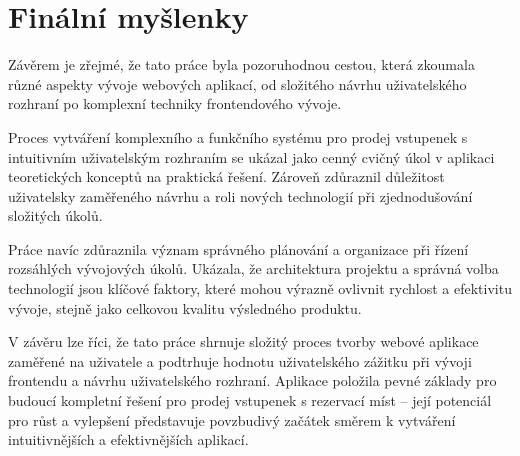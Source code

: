 \section*{Finální myšlenky}
\label{sec:zaver-myslenky}
Závěrem je zřejmé, že tato práce byla pozoruhodnou cestou, která zkoumala různé aspekty vývoje webových aplikací, od složitého návrhu uživatelského rozhraní po komplexní techniky frontendového vývoje.

Proces vytváření komplexního a funkčního systému pro prodej vstupenek s intuitivním uživatelským rozhraním se ukázal jako cenný cvičný úkol v aplikaci teoretických konceptů na praktická řešení.
Zároveň zdůraznil důležitost uživatelsky zaměřeného návrhu a roli nových technologií při zjednodušování složitých úkolů.

Práce navíc zdůraznila význam správného plánování a organizace při řízení rozsáhlých vývojových úkolů.
Ukázala, že architektura projektu a správná volba technologií jsou klíčové faktory, které mohou výrazně ovlivnit rychlost a efektivitu vývoje, stejně jako celkovou kvalitu výsledného produktu.

V závěru lze říci, že tato práce shrnuje složitý proces tvorby webové aplikace zaměřené na uživatele a podtrhuje hodnotu uživatelského zážitku při vývoji frontendu a návrhu uživatelského rozhraní.
Aplikace položila pevné základy pro budoucí kompletní řešení pro prodej vstupenek s rezervací míst – její potenciál pro růst a vylepšení představuje povzbudivý začátek směrem k vytváření intuitivnějších a efektivnějších aplikací.



